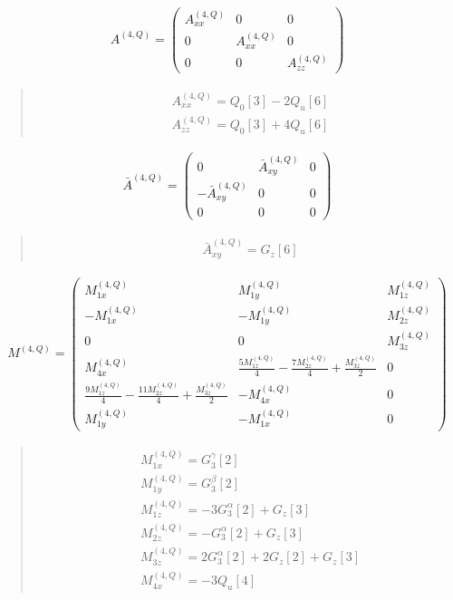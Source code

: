 \documentclass[fleqn,10pt]{jsarticle}
\begin{document}
\begin{align*}
A^{(4,Q)} = \begin{pmatrix} A^{(4,Q)}_{xx} & 0 & 0 \\ 0 & A^{(4,Q)}_{xx} & 0 \\ 0 & 0 & A^{(4,Q)}_{zz} \end{pmatrix}
\end{align*}
\begin{quote}
\begin{align*}
& A^{(4,Q)}_{xx} = Q_{0}[3] - 2 Q_{u}[6] \\
& A^{(4,Q)}_{zz} = Q_{0}[3] + 4 Q_{u}[6]
\end{align*}
\end{quote}
\begin{align*}
\bar{A}^{(4,Q)} = \begin{pmatrix} 0 & \bar{A}^{(4,Q)}_{xy} & 0 \\ - \bar{A}^{(4,Q)}_{xy} & 0 & 0 \\ 0 & 0 & 0 \end{pmatrix}
\end{align*}
\begin{quote}
\begin{align*}
& \bar{A}^{(4,Q)}_{xy} = G_{z}[6]
\end{align*}
\end{quote}
\begin{align*}
M^{(4,Q)} = \begin{pmatrix} M^{(4,Q)}_{1x} & M^{(4,Q)}_{1y} & M^{(4,Q)}_{1z} \\ - M^{(4,Q)}_{1x} & - M^{(4,Q)}_{1y} & M^{(4,Q)}_{2z} \\ 0 & 0 & M^{(4,Q)}_{3z} \\ M^{(4,Q)}_{4x} & \frac{5 M^{(4,Q)}_{1z}}{4} - \frac{7 M^{(4,Q)}_{2z}}{4} + \frac{M^{(4,Q)}_{3z}}{2} & 0 \\ \frac{9 M^{(4,Q)}_{1z}}{4} - \frac{11 M^{(4,Q)}_{2z}}{4} + \frac{M^{(4,Q)}_{3z}}{2} & - M^{(4,Q)}_{4x} & 0 \\ M^{(4,Q)}_{1y} & - M^{(4,Q)}_{1x} & 0 \end{pmatrix}
\end{align*}
\begin{quote}
\begin{align*}
& M^{(4,Q)}_{1x} = G_{3}^{\gamma}[2] \\
& M^{(4,Q)}_{1y} = G_{3}^{\beta}[2] \\
& M^{(4,Q)}_{1z} = - 3 G_{3}^{\alpha}[2] + G_{z}[3] \\
& M^{(4,Q)}_{2z} = - G_{3}^{\alpha}[2] + G_{z}[3] \\
& M^{(4,Q)}_{3z} = 2 G_{3}^{\alpha}[2] + 2 G_{z}[2] + G_{z}[3] \\
& M^{(4,Q)}_{4x} = - 3 Q_{u}[4]
\end{align*}
\end{quote}
\end{document}
